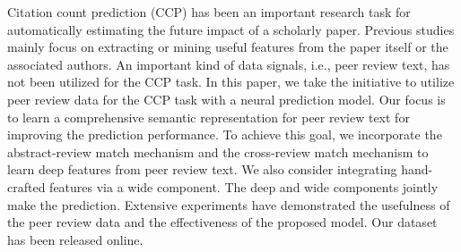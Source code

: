 Citation count prediction (CCP) has been an important research task for automatically estimating the future impact of a scholarly paper. Previous studies mainly focus on extracting or mining useful features from the paper itself or the associated authors. An important kind of data signals,  i.e., peer review text, has not been utilized for the CCP task. In this paper, we take the initiative to utilize peer review data for the CCP task with a neural prediction model. Our focus is to learn a comprehensive  semantic representation for peer review text for improving the prediction performance. To achieve this goal, we incorporate the abstract-review match mechanism and the cross-review match mechanism to learn deep features from peer review text. We also consider integrating hand-crafted features via a wide component. The deep and wide components jointly make the prediction. Extensive experiments have demonstrated the usefulness of the peer review data and the effectiveness of the proposed model. Our dataset has been released online.